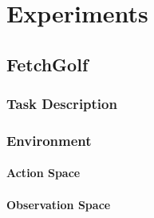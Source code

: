 \chapter{Experiments}

















\section{FetchGolf}




\subsection{Task Description}



\subsection{Environment}



\subsubsection{Action Space}



\subsubsection{Observation Space}



